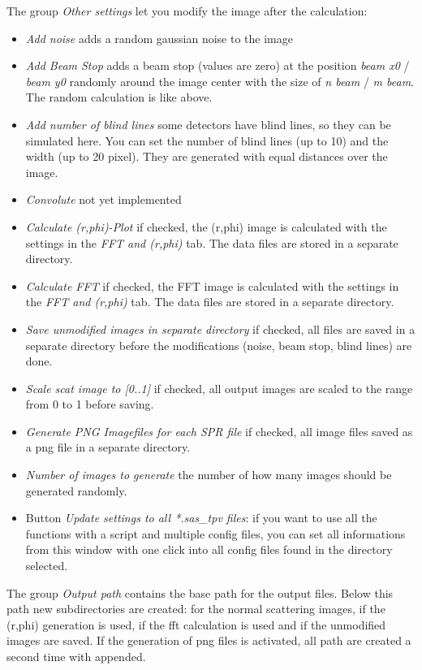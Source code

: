 \documentclass[11pt]{article} %
\begin{document}
The group {\it Other settings} let you modify the image after the calculation:
\begin{itemize}\itemsep0pt
\item {\it Add noise} adds a random gaussian noise to the image
\item {\it Add Beam Stop} adds a beam stop (values are zero) at the position {\it beam x0} / {\it beam y0} randomly around the image center with the size of {\it n beam} / {\it m beam}. The random calculation is like above.
\item {\it Add number of blind lines} some detectors have blind lines, so they can be simulated here. You can set the number of blind lines (up to 10) and the width (up to 20 pixel). They are generated with equal distances over the image.
\item {\it Convolute} not yet implemented
\item {\it Calculate (r,phi)-Plot} if checked, the (r,phi) image is calculated with the settings in the {\it FFT and (r,phi)} tab. The data files are stored in a separate directory.
\item {\it Calculate FFT} if checked, the FFT image is calculated with the settings in the {\it FFT and (r,phi)} tab. The data files are stored in a separate directory.
\item {\it Save unmodified images in separate directory} if checked, all files are saved in a separate directory before the modifications (noise, beam stop, blind lines) are done.
\item {\it Scale scat image to [0..1]} if checked, all output images are scaled to the range from 0 to 1 before saving.
\item {\it Generate PNG Imagefiles for each SPR file} if checked, all image files saved as a png file in a separate directory.
\item {\it Number of images to generate} the number of how many images should be generated randomly.
\item Button {\it Update settings to all *.sas\_tpv files}: if you want to use all the functions with a script and multiple config files, you can set all informations from this window with one click into all config files found in the directory selected.
\end{itemize}

The group {\it Output path} contains the base path for the output files. Below this path new subdirectories are created:  for the normal scattering images,  if the (r,phi) generation is used,  if the fft calculation is used and  if the unmodified images are saved. If the generation of png files is activated, all path are created a second time with  appended.
\end{document}
